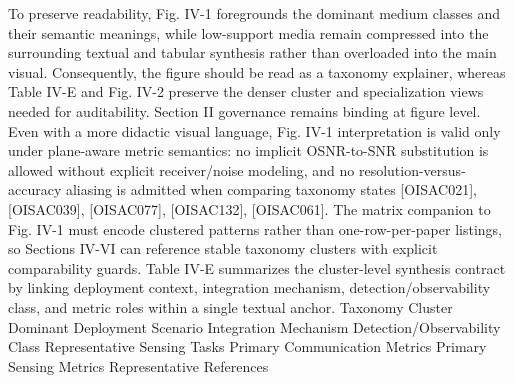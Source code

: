 {}To preserve readability, Fig. IV-1 foregrounds the dominant medium classes and their semantic meanings, while low-support media remain compressed into the surrounding textual and tabular synthesis rather than overloaded into the main visual. Consequently, the figure should be read as a taxonomy explainer, whereas Table IV-E and Fig. IV-2 preserve the denser cluster and specialization views needed for auditability.\markdownRendererParagraphSeparator
{}\markdownRendererParagraphSeparator
{}Section II governance remains binding at figure level. Even with a more didactic visual language, Fig. IV-1 interpretation is valid only under plane-aware metric semantics: no implicit OSNR-to-SNR substitution is allowed without explicit receiver/noise modeling, and no resolution-versus-accuracy aliasing is admitted when comparing taxonomy states [O\markdownRendererUnderscore{}ISAC\markdownRendererUnderscore{}021], [O\markdownRendererUnderscore{}ISAC\markdownRendererUnderscore{}039], [O\markdownRendererUnderscore{}ISAC\markdownRendererUnderscore{}077], [O\markdownRendererUnderscore{}ISAC\markdownRendererUnderscore{}132], [O\markdownRendererUnderscore{}ISAC\markdownRendererUnderscore{}061].\markdownRendererInterblockSeparator
{}
\markdownRendererSectionEnd \markdownRendererSectionBegin
{}\markdownRendererInterblockSeparator
{}The matrix companion to Fig. IV-1 must encode clustered patterns rather than one-row-per-paper listings, so Sections IV-VI can reference stable taxonomy clusters with explicit comparability guards. Table IV-E summarizes the cluster-level synthesis contract by linking deployment context, integration mechanism, detection/observability class, and metric roles within a single textual anchor.\markdownRendererParagraphSeparator
{}\markdownRendererPipe{} Taxonomy Cluster \markdownRendererPipe{} Dominant Deployment Scenario \markdownRendererPipe{} Integration Mechanism \markdownRendererPipe{} Detection/Observability Class \markdownRendererPipe{} Representative Sensing Tasks \markdownRendererPipe{} Primary Communication Metrics \markdownRendererPipe{} Primary Sensing Metrics \markdownRendererPipe{} Representative References \markdownRendererPipe{}\markdownRendererSoftLineBreak

